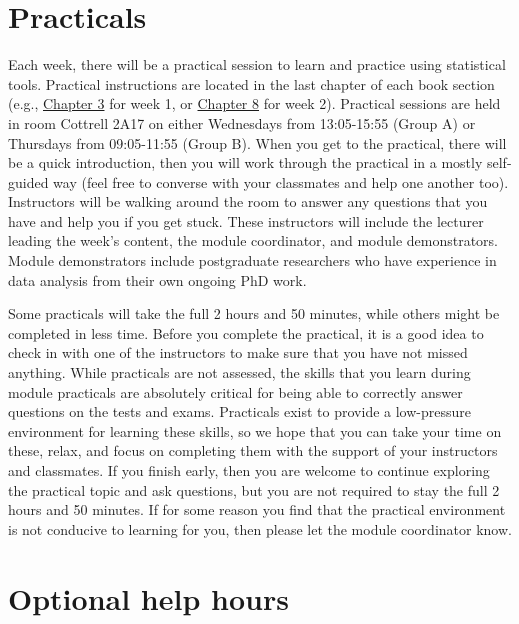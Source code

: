 \documentclass[
]{scrbook}
\begin{document}
\hypertarget{practicals}{%
\section*{Practicals}\label{practicals}}

Each week, there will be a practical session to learn and practice using statistical tools.
Practical instructions are located in the last chapter of each book section (e.g., \protect\hyperlink{Chapter_3}{Chapter 3} for week 1, or \protect\hyperlink{Chapter_8}{Chapter 8} for week 2).
Practical sessions are held in room Cottrell 2A17 on either Wednesdays from 13:05-15:55 (Group A) or Thursdays from 09:05-11:55 (Group B).
When you get to the practical, there will be a quick introduction, then you will work through the practical in a mostly self-guided way (feel free to converse with your classmates and help one another too).
Instructors will be walking around the room to answer any questions that you have and help you if you get stuck.
These instructors will include the lecturer leading the week's content, the module coordinator, and module demonstrators.
Module demonstrators include postgraduate researchers who have experience in data analysis from their own ongoing PhD work.

Some practicals will take the full 2 hours and 50 minutes, while others might be completed in less time.
Before you complete the practical, it is a good idea to check in with one of the instructors to make sure that you have not missed anything.
While practicals are not assessed, the skills that you learn during module practicals are absolutely critical for being able to correctly answer questions on the tests and exams.
Practicals exist to provide a low-pressure environment for learning these skills, so we hope that you can take your time on these, relax, and focus on completing them with the support of your instructors and classmates.
If you finish early, then you are welcome to continue exploring the practical topic and ask questions, but you are not required to stay the full 2 hours and 50 minutes.
If for some reason you find that the practical environment is not conducive to learning for you, then please let the module coordinator know.

\hypertarget{help}{%
\section*{Optional help hours}\label{help}}
\end{document}
